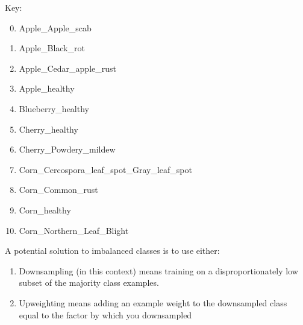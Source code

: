     Key:
    \begin{multicols}{2}
    \begin{enumerate}
        \setcounter{enumi}{-1}
        \item Apple\_Apple\_scab
        \item Apple\_Black\_rot
        \item Apple\_Cedar\_apple\_rust
        \item Apple\_healthy
        \item Blueberry\_healthy
        \item Cherry\_healthy
        \item Cherry\_Powdery\_mildew
        \item Corn\_Cercospora\_leaf\_spot\_Gray\_leaf\_spot
        \item Corn\_Common\_rust
        \item Corn\_healthy
        \item Corn\_Northern\_Leaf\_Blight
    \end{enumerate}
    \end{multicols}

    \vspace{2em}

    A potential solution to imbalanced classes is to use either:
    \begin{enumerate}
        \item Downsampling (in this context) means training on a disproportionately low subset of the majority class examples.
        \item Upweighting means adding an example weight to the downsampled class equal to the factor by which you downsampled
    \end{enumerate}

    

    

    
    
    


\par

\newpage